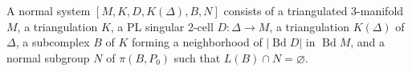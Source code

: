 A normal system $[M, K, D, K(\Delta), B, N]$ consists of a triangulated 3-manifold $M$, a triangulation $K$, a PL singular 2-cell $D: \Delta \to M$, a triangulation $K(\Delta)$ of $\Delta$, a subcomplex $B$ of $K$ forming a neighborhood of $|\operatorname{Bd} D|$ in $\operatorname{Bd} M$, and a normal subgroup $N$ of $\pi(B, P_0)$ such that $L(B) \cap N = \varnothing$.
